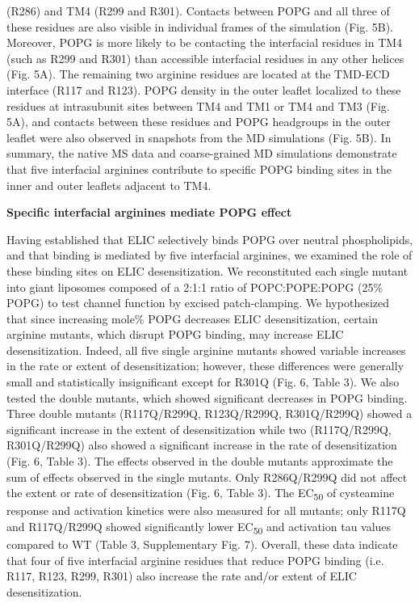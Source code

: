 (R286) and TM4 (R299 and R301). Contacts between POPG and all three of
these residues are also visible in individual frames of the simulation
(Fig. 5B). Moreover, POPG is more likely to be contacting the
interfacial residues in TM4 (such as R299 and R301) than accessible
interfacial residues in any other helices (Fig. 5A). The remaining two
arginine residues are located at the TMD-ECD interface (R117 and R123).
POPG density in the outer leaflet localized to these residues at
intrasubunit sites between TM4 and TM1 or TM4 and TM3 (Fig. 5A), and
contacts between these residues and POPG headgroups in the outer leaflet
were also observed in snapshots from the MD simulations (Fig. 5B). In
summary, the native MS data and coarse-grained MD simulations
demonstrate that five interfacial arginines contribute to specific POPG
binding sites in the inner and outer leaflets adjacent to TM4.

\textbf{Specific interfacial arginines mediate POPG effect}

Having established that ELIC selectively binds POPG over neutral
phospholipids, and that binding is mediated by five interfacial
arginines, we examined the role of these binding sites on ELIC
desensitization. We reconstituted each single mutant into giant
liposomes composed of a 2:1:1 ratio of POPC:POPE:POPG (25\% POPG) to
test channel function by excised patch-clamping. We hypothesized that
since increasing mole\% POPG decreases ELIC desensitization, certain
arginine mutants, which disrupt POPG binding, may increase ELIC
desensitization. Indeed, all five single arginine mutants showed
variable increases in the rate or extent of desensitization; however,
these differences were generally small and statistically insignificant
except for R301Q (Fig. 6, Table 3). We also tested the double mutants,
which showed significant decreases in POPG binding. Three double mutants
(R117Q/R299Q, R123Q/R299Q, R301Q/R299Q) showed a significant increase in
the extent of desensitization while two (R117Q/R299Q, R301Q/R299Q) also
showed a significant increase in the rate of desensitization (Fig. 6,
Table 3). The effects observed in the double mutants approximate the sum
of effects observed in the single mutants. Only R286Q/R299Q did not
affect the extent or rate of desensitization (Fig. 6, Table 3). The
EC\textsubscript{50} of cysteamine response and activation kinetics were
also measured for all mutants; only R117Q and R117Q/R299Q showed
significantly lower EC\textsubscript{50} and activation tau values
compared to WT (Table 3, Supplementary Fig. 7). Overall, these data
indicate that four of five interfacial arginine residues that reduce
POPG binding (i.e. R117, R123, R299, R301) also increase the rate and/or
extent of ELIC desensitization.

